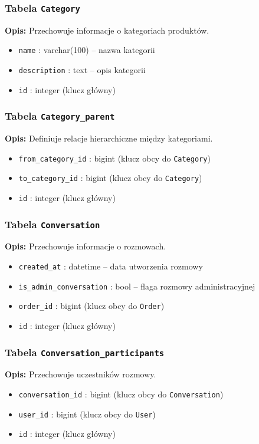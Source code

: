 \documentclass[12pt,a4paper,oneside]{article}
\theoremstyle{definition}
\numberwithin{equation}{section}
\begin{document}
\subsubsection*{Tabela \texttt{Category}}
\textbf{Opis:} Przechowuje informacje o kategoriach produktów.
\begin{itemize}
    \item \texttt{name} : varchar(100) – nazwa kategorii
    \item \texttt{description} : text – opis kategorii
    \item \texttt{id} : integer (klucz główny)
\end{itemize}

\subsubsection*{Tabela \texttt{Category\string_parent}}
\textbf{Opis:} Definiuje relacje hierarchiczne między kategoriami.
\begin{itemize}
    \item \texttt{from\string_category\string_id} : bigint (klucz obcy do \texttt{Category})
    \item \texttt{to\string_category\string_id} : bigint (klucz obcy do \texttt{Category})
    \item \texttt{id} : integer (klucz główny)
\end{itemize}

\subsubsection*{Tabela \texttt{Conversation}}
\textbf{Opis:} Przechowuje informacje o rozmowach.
\begin{itemize}
    \item \texttt{created\string_at} : datetime – data utworzenia rozmowy
    \item \texttt{is\string_admin\string_conversation} : bool – flaga rozmowy administracyjnej
    \item \texttt{order\string_id} : bigint (klucz obcy do \texttt{Order})
    \item \texttt{id} : integer (klucz główny)
\end{itemize}

\subsubsection*{Tabela \texttt{Conversation\string_participants}}
\textbf{Opis:} Przechowuje uczestników rozmowy.
\begin{itemize}
    \item \texttt{conversation\string_id} : bigint (klucz obcy do \texttt{Conversation})
    \item \texttt{user\string_id} : bigint (klucz obcy do \texttt{User})
    \item \texttt{id} : integer (klucz główny)
\end{itemize}
\end{document}
